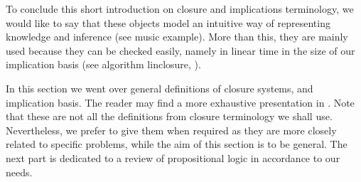 \vspace{1.2em}

To conclude this short introduction on closure and implications terminology, we 
would like to say that these objects model an intuitive way of representing
knowledge and inference (see music example). More than this, they are mainly 
used because they can be checked easily, namely in linear time in the size of
our implication basis (see algorithm linclosure, 
\cite{b._ganter_conceptual_2016, david_minimum_1980,maier_theory_1983}).

	In this section we went over general definitions of closure systems, and 
implication basis. The reader may find a more exhaustive presentation in 
\cite{b._ganter_conceptual_2016, davey_introduction_2002}. Note that these are 
not all the definitions from closure 
terminology we shall use. Nevertheless, we prefer to give them when required as 
they are more closely related to specific problems, while the aim of this 
section is to be general. The next part is dedicated to a review of 
propositional logic in accordance to our needs.









